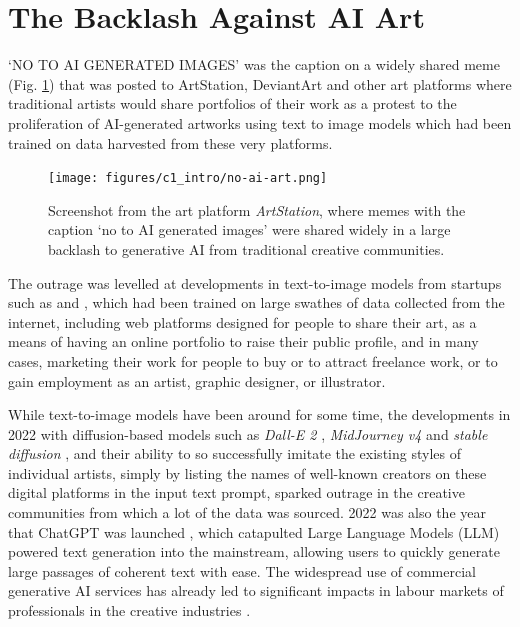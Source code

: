 \section{The Backlash Against AI Art}

`NO TO AI GENERATED IMAGES' was the caption on a widely shared meme  (Fig. \ref{fig:c1:no-ai-art}) that was posted to ArtStation, DeviantArt and other art platforms where traditional artists would share portfolios of their work as a protest to the proliferation of AI-generated artworks using text to image models which had been trained on data harvested from these very platforms. 

\begin{figure}[!htb]
    \centering
    \captionsetup{justification=centering}
    \texttt{[image: figures/c1\_intro/no-ai-art.png]}
    \caption['No-AI memes being shared on the platform ArtStation]{Screenshot from the art platform \textit{ArtStation}, where memes with the caption `no to AI generated images' were shared widely in a large backlash to generative AI from traditional creative communities.}
    \label{fig:c1:no-ai-art}
\end{figure}

The outrage was levelled at developments in text-to-image models from startups such as \cite{midjourney2023midjourney} and \cite{stability2023stability}, which had been trained on large swathes of data collected from the internet, including web platforms designed for people to share their art, as a means of having an online portfolio to raise their public profile, and in many cases, marketing their work for people to buy or to attract freelance work, or to gain employment as an artist, graphic designer, or illustrator.

While text-to-image models have been around for some time, the developments in 2022 with diffusion-based models such as \textit{Dall-E 2} \citep{openai2022dalle2}, \textit{MidJourney v4} \citep{edwards2022midjourney} and \textit{stable diffusion} \citep{stability2022stable}, and their ability to so successfully imitate the existing styles of individual artists, simply by listing the names of well-known creators on these digital platforms in the input text prompt, sparked outrage in the creative communities from which a lot of the data was sourced.
2022 was also the year that ChatGPT was launched \citep{openai2022chatgpt}, which catapulted Large Language Models (LLM) powered text generation into the mainstream, allowing users to quickly generate large passages of coherent text with ease.
The widespread use of commercial generative AI services has already led to significant impacts in labour markets of professionals in the creative industries \citep{hui2024short}.

